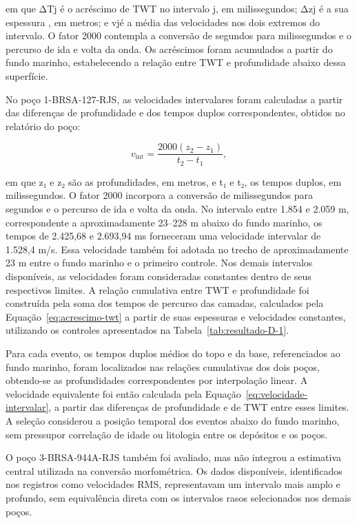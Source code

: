 \noindent
em que ΔTj é o acréscimo de TWT no intervalo j, em milissegundos; Δzj é a sua espessura , em metros; e vjé a média das velocidades nos dois extremos do intervalo. O fator 2000 contempla a conversão de segundos para milissegundos e o percurso de ida e volta da onda. Os acréscimos foram acumulados a partir do fundo marinho, estabelecendo a relação entre TWT e profundidade abaixo dessa superfície.

No poço 1-BRSA-127-RJS, as velocidades intervalares foram calculadas a partir das diferenças de profundidade e dos tempos duplos correspondentes, obtidos no relatório do poço:

\begin{equation}
  v_{\mathrm{int}}=\frac{2000(z_2-z_1)}{t_2-t_1},
  \label{eq:velocidade-intervalar}
\end{equation}

\noindent
em que z₁ e z₂ são as profundidades, em metros, e t₁ e t₂, os tempos duplos, em milissegundos. O fator 2000 incorpora a conversão de milissegundos para segundos e o percurso de ida e volta da onda. No intervalo entre 1.854 e 2.059 m, correspondente a aproximadamente 23--228 m abaixo do fundo marinho, os tempos de 2.425,68 e 2.693,94 ms forneceram uma velocidade intervalar de 1.528,4 m/s. Essa velocidade também foi adotada no trecho de aproximadamente 23 m entre o fundo marinho e o primeiro controle. Nos demais intervalos disponíveis, as velocidades foram consideradas constantes dentro de seus respectivos limites. A relação cumulativa entre TWT e profundidade foi construída pela soma dos tempos de percurso das camadas, calculados pela Equação~\eqref{eq:acrescimo-twt} a partir de suas espessuras e velocidades constantes, utilizando os controles apresentados na Tabela~\ref{tab:resultado-D-1}.

Para cada evento, os tempos duplos médios do topo e da base, referenciados ao fundo marinho, foram localizados nas relações cumulativas dos dois poços, obtendo-se as profundidades correspondentes por interpolação linear. A velocidade equivalente foi então calculada pela Equação~\eqref{eq:velocidade-intervalar}, a partir das diferenças de profundidade e de TWT entre esses limites. A seleção considerou a posição temporal dos eventos abaixo do fundo marinho, sem pressupor correlação de idade ou litologia entre os depósitos e os poços.

O poço 3-BRSA-944A-RJS também foi avaliado, mas não integrou a estimativa central utilizada na conversão morfométrica. Os dados disponíveis, identificados nos registros como velocidades RMS, representavam um intervalo mais amplo e profundo, sem equivalência direta com os intervalos rasos selecionados nos demais poços.

